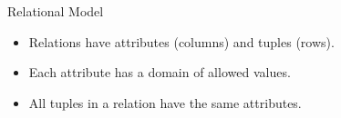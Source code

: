 \begin{frame}{Relational Model}
    \begin{itemize}
        \item Relations have attributes (columns) and tuples (rows).
        \item Each attribute has a domain of allowed values.
        \item All tuples in a relation have the same attributes.
    \end{itemize}
\end{frame}